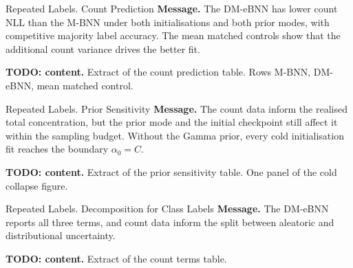 \begin{frame}{Repeated Labels. Count Prediction}
	\textbf{Message.} The DM-eBNN has lower count NLL than the M-BNN under both initialisations and both prior modes, with competitive majority label accuracy. The mean matched controls show that the additional count variance drives the better fit.

	\medskip
	\textbf{TODO: content.} Extract of the count prediction table. Rows M-BNN, DM-eBNN, mean matched control.
\end{frame}

\begin{frame}{Repeated Labels. Prior Sensitivity}
	\textbf{Message.} The count data inform the realised total concentration, but the prior mode and the initial checkpoint still affect it within the sampling budget. Without the Gamma prior, every cold initialisation fit reaches the boundary $\alpha_0 = C$.

	\medskip
	\textbf{TODO: content.} Extract of the prior sensitivity table. One panel of the cold collapse figure.
\end{frame}

\begin{frame}{Repeated Labels. Decomposition for Class Labels}
	\textbf{Message.} The DM-eBNN reports all three terms, and count data inform the split between aleatoric and distributional uncertainty.

	\medskip
	\textbf{TODO: content.} Extract of the count terms table.
\end{frame}
